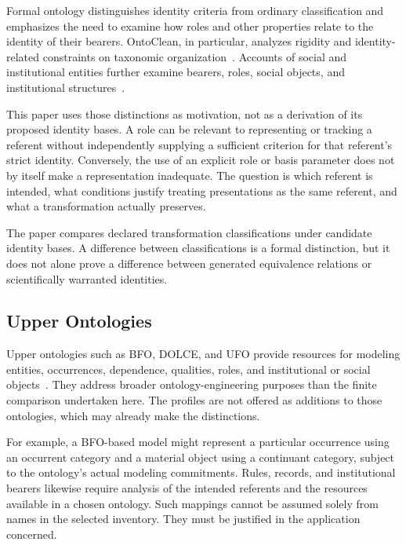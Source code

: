 Formal ontology distinguishes identity criteria from ordinary
classification and emphasizes the need to examine how roles and other
properties relate to the identity of their bearers.
OntoClean, in particular, analyzes rigidity and identity-related
constraints on taxonomic organization~\citep{guarino1998roles,guarinowelty2002}.
Accounts of social and institutional entities further examine bearers,
roles, social objects, and institutional structures~\citep{masolo2003wonderweb,guizzardi2005}.

This paper uses those distinctions as motivation, not as a derivation
of its proposed identity bases.
A role can be relevant to representing
or tracking a referent without independently supplying a sufficient
criterion for that referent's strict identity.
Conversely, the use of
an explicit role or basis parameter does not by itself make a
representation inadequate.
The question is which referent is intended,
what conditions justify treating presentations as the same referent,
and what a transformation actually preserves.

The paper compares declared transformation classifications under
candidate identity bases.
A difference between classifications is a
formal distinction, but it does not alone prove a difference between
generated equivalence relations or scientifically warranted identities.

\subsection{Upper Ontologies}
\label{subsec:related_upper_ontologies}

Upper ontologies such as BFO, DOLCE, and UFO provide resources for
modeling entities, occurrences, dependence, qualities, roles, and
institutional or social objects~\citep{smithceusters2015bfo,arp2015building,gangemi2002dolce,guizzardi2005}.
They address broader ontology-engineering purposes than the finite
comparison undertaken here.
The profiles are not offered as additions to those ontologies, which
may already make the distinctions.

For example, a BFO-based model might represent a particular occurrence
using an occurrent category and a material object using a continuant
category, subject to the ontology's actual modeling commitments.
Rules, records, and institutional bearers likewise require analysis of
the intended referents and the resources available in a chosen ontology.
Such mappings cannot be assumed solely from names in the selected
inventory.
They must be justified in the application concerned.

